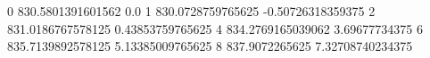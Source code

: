 0 830.5801391601562 0.0
1 830.0728759765625 -0.50726318359375
2 831.0186767578125 0.43853759765625
4 834.2769165039062 3.69677734375
6 835.7139892578125 5.13385009765625
8 837.9072265625 7.32708740234375
